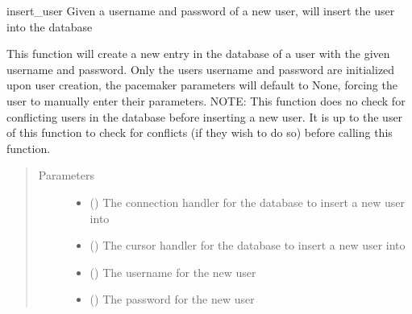\documentclass[letterpaper,10pt,english]{sphinxmanual}
\begin{document}
\begin{fulllineitems}
\label{\detokenize{index:data.database.insert_user}}
insert\_user Given a username and password of a new user, will insert the user into the database

This function will create a new entry in the database of a user with the given username and password.
Only the users username and password are initialized upon user creation, the pacemaker parameters will
default to None, forcing the user to manually enter their parameters.
NOTE: This function does no check for conflicting users in the database before inserting a new user.
It is up to the user of this function to check for conflicts (if they wish to do so) before calling
this function.
\begin{quote}\begin{description}
\item[{Parameters}] \leavevmode\begin{itemize}
\item {} 
 () \textendash{} The connection handler for the database to insert a new user into

\item {} 
 () \textendash{} The cursor handler for the database to insert a new user into

\item {} 
 () \textendash{} The username for the new user

\item {} 
 () \textendash{} The password for the new user

\end{itemize}

\end{description}\end{quote}

\end{fulllineitems}

\end{document}
